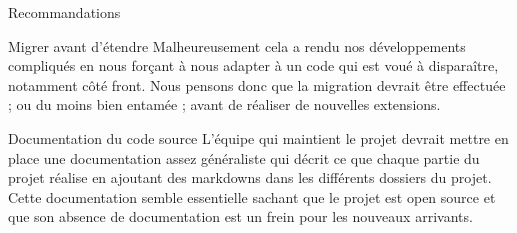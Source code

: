 \documentclass[]{article}
\begin{document}
{\begin{section}{Recommandations}
\begin{subsection}{Migrer avant d'étendre}
     Malheureusement cela a rendu nos développements compliqués en nous forçant à nous adapter à un code qui est voué à disparaître, notamment côté front. Nous pensons donc que la migration devrait être effectuée ; ou du moins bien entamée ; avant de réaliser de nouvelles extensions.
 \end{subsection}

 \begin{subsection}{Documentation du code source}
     L'équipe qui maintient le projet devrait mettre en place une documentation assez généraliste qui décrit ce que chaque partie du projet réalise en ajoutant des markdowns dans les différents dossiers du projet. Cette documentation semble essentielle sachant que le projet est open source et que son absence de documentation est un frein pour les nouveaux arrivants.
 \end{subsection}
\end{section}

}
\end{document}
